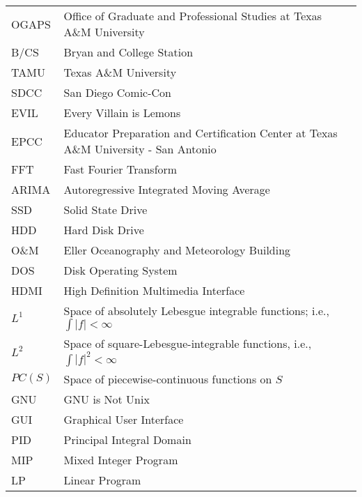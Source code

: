 \hspace*{-1.25in}
\vspace{12pt}
\begin{spacing}{1.0}
	\begin{longtable}[htbp]{@{}p{} p{}@{}}
		OGAPS	&	Office of Graduate and Professional Studies at Texas A\&M University\\	[2ex]
		B/CS		&	Bryan and College Station\\	[2ex] %
		TAMU			&	Texas A\&M University\\	[2ex]
		SDCC & San Diego Comic-Con\\ [2ex]
		EVIL & Every Villain is Lemons\\ [2ex]
		EPCC & Educator Preparation and Certification Center at Texas A\&M University - San Antonio\\ [2ex]
		FFT & Fast Fourier Transform\\ [2ex]
		ARIMA & Autoregressive Integrated Moving Average\\ [2ex]
		SSD & Solid State Drive\\ [2ex]
		HDD & Hard Disk Drive\\ [2ex]
		O\&M & Eller Oceanography and Meteorology Building\\ [2ex]
		DOS & Disk Operating System\\ [2ex]
		HDMI & High Definition Multimedia Interface\\ [2ex]
		$L^1$ & Space of absolutely Lebesgue integrable functions; i.e., $\int |f| < \infty$\\ [2ex]
		$L^2$ & Space of square-Lebesgue-integrable functions, i.e., $\int |f|^2 < \infty$\\ [2ex]
		$PC(S)$ & Space of piecewise-continuous functions on $S$\\ [2ex]
		GNU & GNU is Not Unix\\ [2ex]
		GUI & Graphical User Interface\\ [2ex]
		PID & Principal Integral Domain\\ [2ex]
		MIP & Mixed Integer Program\\ [2ex]
		LP & Linear Program\\ [2ex]
	\end{longtable}
\end{spacing}

\pagebreak{}